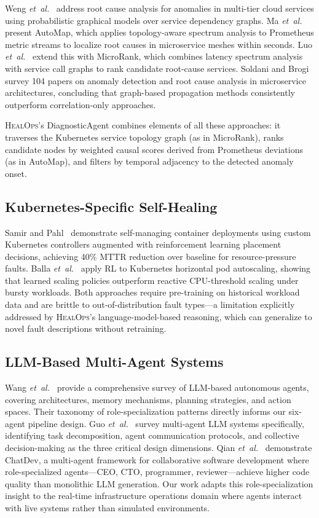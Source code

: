 \documentclass[journal,10pt,twoside]{IEEEtran}
\newcommand{\HealOps}{\textsc{HealOps}}
\newcommand{\etal}{\textit{et~al.}}
\begin{document}
Weng \etal~\cite{weng2018root} address root cause analysis for anomalies
in multi-tier cloud services using probabilistic graphical models over
service dependency graphs. Ma \etal~\cite{ma2020automap} present AutoMap,
which applies topology-aware spectrum analysis to Prometheus metric
streams to localize root causes in microservice meshes within seconds.
Luo \etal~\cite{luo2021microrank} extend this with MicroRank, which
combines latency spectrum analysis with service call graphs to rank
candidate root-cause services. Soldani and Brogi~\cite{soldani2022anomaly}
survey 104 papers on anomaly detection and root cause analysis in
microservice architectures, concluding that graph-based propagation
methods consistently outperform correlation-only approaches.

\HealOps{}'s DiagnosticAgent combines elements of all these approaches:
it traverses the Kubernetes service topology graph (as in MicroRank),
ranks candidate nodes by weighted causal scores derived from Prometheus
deviations (as in AutoMap), and filters by temporal adjacency to the
detected anomaly onset.

\subsection{Kubernetes-Specific Self-Healing}

Samir and Pahl~\cite{samir2019self} demonstrate self-managing container
deployments using custom Kubernetes controllers augmented with
reinforcement learning placement decisions, achieving 40\% MTTR reduction
over baseline for resource-pressure faults. Balla \etal~\cite{balla2020adapting}
apply RL to Kubernetes horizontal pod autoscaling, showing that learned
scaling policies outperform reactive CPU-threshold scaling under bursty
workloads. Both approaches require pre-training on historical workload
data and are brittle to out-of-distribution fault types---a limitation
explicitly addressed by \HealOps{}'s language-model-based reasoning, which
can generalize to novel fault descriptions without retraining.

\subsection{LLM-Based Multi-Agent Systems}

Wang \etal~\cite{wang2024survey} provide a comprehensive survey of LLM-based
autonomous agents, covering architectures, memory mechanisms, planning
strategies, and action spaces. Their taxonomy of role-specialization patterns
directly informs our six-agent pipeline design. Guo \etal~\cite{guo2024agents}
survey multi-agent LLM systems specifically, identifying task decomposition,
agent communication protocols, and collective decision-making as the three
critical design dimensions. Qian \etal~\cite{qian2024chatdev} demonstrate
ChatDev, a multi-agent framework for collaborative software development where
role-specialized agents---CEO, CTO, programmer, reviewer---achieve higher
code quality than monolithic LLM generation. Our work adapts this
role-specialization insight to the real-time infrastructure operations domain
where agents interact with live systems rather than simulated environments.
\end{document}
